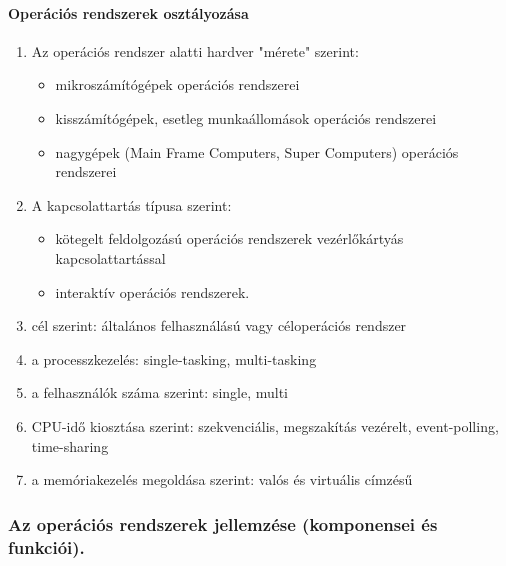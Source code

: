 \paragraph{Operációs rendszerek osztályozása}
	\begin{enumerate}
	\item Az operációs rendszer alatti hardver "mérete" szerint:
		\begin{itemize}
		\item mikroszámítógépek operációs rendszerei
		\item kisszámítógépek, esetleg munkaállomások operációs rendszerei
		\item nagygépek (Main Frame Computers, Super Computers) operációs rendszerei
		\end{itemize}
	\item A kapcsolattartás típusa szerint:
		\begin{itemize}
		\item kötegelt feldolgozású operációs rendszerek vezérlőkártyás kapcsolattartással
		\item interaktív operációs rendszerek.
		\end{itemize}
	\item cél szerint: általános felhasználású vagy céloperációs rendszer
	\item a processzkezelés: single-tasking, multi-tasking
	\item a felhasználók száma szerint: single, multi
	\item CPU-idő kiosztása szerint: szekvenciális, megszakítás vezérelt, event-polling, time-sharing
	\item a memóriakezelés megoldása szerint: valós és virtuális címzésű
	\end{enumerate}

\subsubsection{Az operációs rendszerek jellemzése (komponensei és funkciói).}
